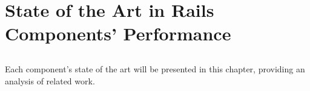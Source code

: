 \chapter{State of the Art in Rails Components' Performance} %
\label{cha:state_of_the_art}

\section*{} %
Each component's state of the art will be presented in this chapter, providing an analysis of related work.






